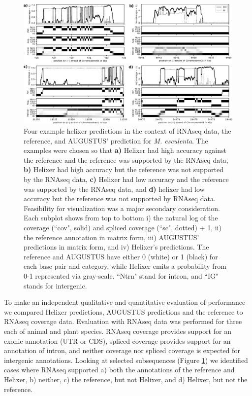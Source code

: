 \documentclass{bioinfo}
\begin{document}
\begin{figure}[!h]
\label{fig:cov_example_main}
\centerline{\includegraphics[width=\textwidth]{images/cov_examples/cov_example_main}}
\caption{Four example helixer predictions in the context of RNAseq data, the reference,
and AUGUSTUS' prediction for {\it M. esculenta}. The examples were chosen so
that {\bf a)} Helixer had high accuracy against the reference and the reference
was supported by the RNAseq data, {\bf b)} Helixer had high accuracy but the 
reference was not supported by the RNAseq data, {\bf c)} Helixer had low accuracy
and the reference was supported by the RNAseq data, and {\bf d)} helixer had low
accuracy but the reference was not supported by RNAseq data. Feasibility for visualization was
a major secondary consideration. Each subplot shows from top to
bottom i) the natural log of the coverage (``cov", solid) and spliced coverage 
(``sc", dotted) + 1, ii) the reference annotation in matrix form, iii) 
AUGUSTUS' predictions in matrix form, and iv) Helixer's predictions. The reference
and AUGUSTUS have either 0 (white) or 1 (black) for each base pair and category, while
Helixer emits a probability from 0-1 represented via gray-scale. ``Ntrn" stand
for intron, and ``IG" stands for intergenic.
}
\end{figure}

To make an independent qualitative and quantitative evaluation of
performance we compared Helixer predictions, AUGUSTUS predictions and the
reference to RNAseq coverage data. Evaluation with RNAseq data was performed for
three each of animal and plant species. RNAseq coverage provides support for an 
exonic annotation (UTR or CDS), spliced coverage provides support for an 
annotation of intron, and neither coverage nor spliced coverage is expected 
for intergenic annotations. Looking at selected subsequences (Figure \ref{fig:cov_example_main}) %
we identified cases where RNAseq supported a) both the annotations of the reference 
and Helixer, b) neither, c) the reference, but not Helixer,
and d) Helixer, but not the reference. 
\end{document}
